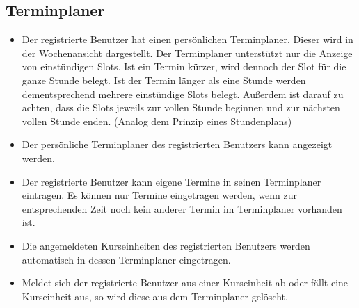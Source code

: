 \documentclass[a4paper]{scrreprt}
\begin{document}
\subsection{Terminplaner}
\begin{itemize}
	\item {}
	Der registrierte Benutzer hat einen persönlichen Terminplaner. Dieser wird in der Wochenansicht dargestellt. Der Terminplaner unterstützt nur die Anzeige von einstündigen Slots. Ist ein Termin kürzer, wird dennoch der Slot für die ganze Stunde belegt. Ist der Termin länger als eine Stunde werden dementsprechend mehrere einstündige Slots belegt.
	Außerdem ist darauf zu achten, dass die Slots jeweils zur vollen Stunde beginnen und zur nächsten vollen Stunde enden. (Analog dem Prinzip eines Stundenplans)
	\item {}
	Der persönliche Terminplaner des registrierten Benutzers kann angezeigt werden. 
	\item {} 
	Der registrierte Benutzer kann eigene Termine in seinen Terminplaner eintragen. Es können nur Termine eingetragen werden, wenn zur entsprechenden Zeit noch kein anderer Termin im Terminplaner vorhanden ist. 
	\item {}
	Die angemeldeten Kurseinheiten des registrierten Benutzers werden automatisch in dessen Terminplaner eingetragen.
	\item {}	
	Meldet sich der registrierte Benutzer aus einer Kurseinheit ab oder fällt eine Kurseinheit aus, so wird diese aus dem Terminplaner gelöscht.
\end{itemize}   
\end{document}
